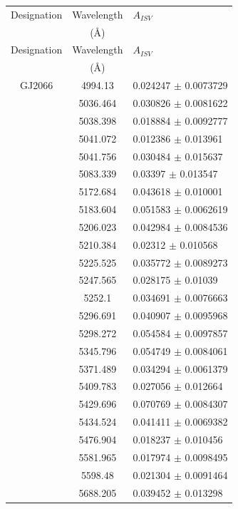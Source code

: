 \begin{longtable}{|c|c|l|}
    \hline
    Designation & Wavelength & $A_{ISV}$\\
     & (\hbox{\AA}) & \\
    \hline
    \endfirsthead
    
    \hline
    Designation & Wavelength & $A_{ISV}$\\
     & (\hbox{\AA}) & \\
    \hline
    \endhead
    
    \hline
    \endfoot
GJ2066 & 4994.13 & 0.024247 $\pm$ 0.0073729 \\  
 & 5036.464 & 0.030826 $\pm$ 0.0081622 \\       
 & 5038.398 & 0.018884 $\pm$ 0.0092777 \\       
 & 5041.072 & 0.012386 $\pm$ 0.013961 \\        
 & 5041.756 & 0.030484 $\pm$ 0.015637 \\        
 & 5083.339 & 0.03397 $\pm$ 0.013547 \\         
 & 5172.684 & 0.043618 $\pm$ 0.010001 \\        
 & 5183.604 & 0.051583 $\pm$ 0.0062619 \\       
 & 5206.023 & 0.042984 $\pm$ 0.0084536 \\       
 & 5210.384 & 0.02312 $\pm$ 0.010568 \\         
 & 5225.525 & 0.035772 $\pm$ 0.0089273 \\       
 & 5247.565 & 0.028175 $\pm$ 0.01039 \\         
 & 5252.1 & 0.034691 $\pm$ 0.0076663 \\         
 & 5296.691 & 0.040907 $\pm$ 0.0095968 \\       
 & 5298.272 & 0.054584 $\pm$ 0.0097857 \\       
 & 5345.796 & 0.054749 $\pm$ 0.0084061 \\       
 & 5371.489 & 0.034294 $\pm$ 0.0061379 \\       
 & 5409.783 & 0.027056 $\pm$ 0.012664 \\        
 & 5429.696 & 0.070769 $\pm$ 0.0084307 \\       
 & 5434.524 & 0.041411 $\pm$ 0.0069382 \\       
 & 5476.904 & 0.018237 $\pm$ 0.010456 \\        
 & 5581.965 & 0.017974 $\pm$ 0.0098495 \\       
 & 5598.48 & 0.021304 $\pm$ 0.0091464 \\        
 & 5688.205 & 0.039452 $\pm$ 0.013298 \\        

\end{longtable}
